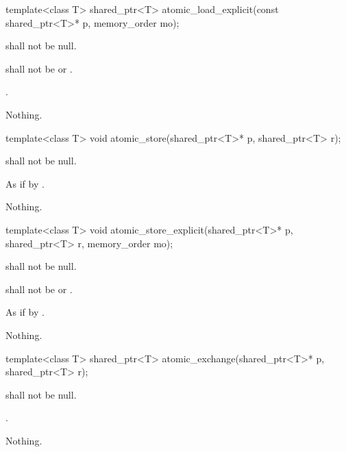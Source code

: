 %
\begin{itemdecl}
template<class T>
  shared_ptr<T> atomic_load_explicit(const shared_ptr<T>* p, memory_order mo);
\end{itemdecl}

\begin{itemdescr}
\pnum
\requires {} shall not be null.

\pnum
\requires {} shall not be  or .

\pnum
\returns {}.

\pnum
\throws Nothing.
\end{itemdescr}

%
\begin{itemdecl}
template<class T>
  void atomic_store(shared_ptr<T>* p, shared_ptr<T> r);
\end{itemdecl}

\begin{itemdescr}
\pnum
\requires {} shall not be null.

\pnum
\effects As if by .

\pnum
\throws Nothing.
\end{itemdescr}

%
\begin{itemdecl}
template<class T>
  void atomic_store_explicit(shared_ptr<T>* p, shared_ptr<T> r, memory_order mo);
\end{itemdecl}

\begin{itemdescr}
\pnum
\requires {} shall not be null.

\pnum
\requires {} shall not be  or .

\pnum
\effects As if by .

\pnum
\throws Nothing.
\end{itemdescr}

%
\begin{itemdecl}
template<class T>
  shared_ptr<T> atomic_exchange(shared_ptr<T>* p, shared_ptr<T> r);
\end{itemdecl}

\begin{itemdescr}
\pnum
\requires {} shall not be null.

\pnum
\returns {}.

\pnum
\throws Nothing.
\end{itemdescr}

